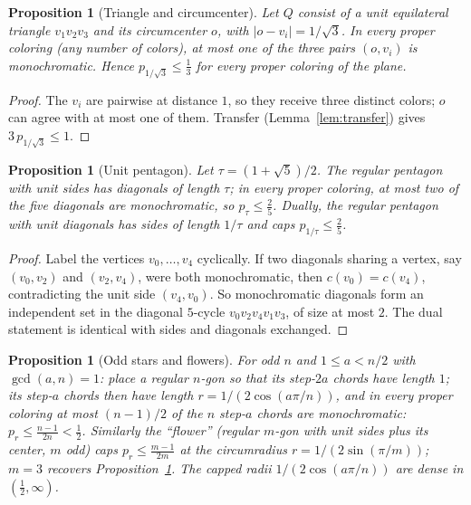 \documentclass[11pt]{article}
\newtheorem{proposition}[theorem]{Proposition}
\theoremstyle{definition}
\theoremstyle{remark}
\begin{document}
\begin{proposition}[Triangle and circumcenter]\label{prop:cap13}
Let $Q$ consist of a unit equilateral triangle $v_1v_2v_3$ and its
circumcenter $o$, with $|o-v_i|=1/\sqrt3$.  In every proper coloring
(any number of colors), at most one of the three pairs $(o,v_i)$ is
monochromatic.  Hence $p_{1/\sqrt3}\le\tfrac13$ for every proper
coloring of the plane.
\end{proposition}

\begin{proof}
The $v_i$ are pairwise at distance $1$, so they receive three distinct
colors; $o$ can agree with at most one of them.  Transfer
(Lemma~\ref{lem:transfer}) gives $3\,p_{1/\sqrt3}\le1$.
\end{proof}

\begin{proposition}[Unit pentagon]\label{prop:cap25}
Let $\tau=(1+\sqrt5)/2$.  The regular pentagon with unit sides has
diagonals of length $\tau$; in every proper coloring, at most two of
the five diagonals are monochromatic, so $p_{\tau}\le\tfrac25$.
Dually, the regular pentagon with unit diagonals has sides of length
$1/\tau$ and caps $p_{1/\tau}\le\tfrac25$.
\end{proposition}

\begin{proof}
Label the vertices $v_0,\dots,v_4$ cyclically.  If two diagonals
sharing a vertex, say $(v_0,v_2)$ and $(v_2,v_4)$, were both
monochromatic, then $c(v_0)=c(v_4)$, contradicting the unit side
$(v_4,v_0)$.  So monochromatic diagonals form an independent set in the
diagonal $5$-cycle $v_0v_2v_4v_1v_3$, of size at most $2$.  The dual
statement is identical with sides and diagonals exchanged.
\end{proof}

\begin{proposition}[Odd stars and flowers]\label{prop:capstar}
For odd $n$ and $1\le a<n/2$ with $\gcd(a,n)=1$: place a regular
$n$-gon so that its step-$2a$ chords have length $1$; its step-$a$
chords then have length $r=1/(2\cos(a\pi/n))$, and in every proper
coloring at most $(n-1)/2$ of the $n$ step-$a$ chords are
monochromatic: $p_r\le\tfrac{n-1}{2n}<\tfrac12$.  Similarly the
``flower'' (regular $m$-gon with unit sides plus its center, $m$ odd)
caps $p_r\le\tfrac{m-1}{2m}$ at the circumradius $r=1/(2\sin(\pi/m))$;
$m=3$ recovers Proposition~\ref{prop:cap13}.  The capped radii
$1/(2\cos(a\pi/n))$ are dense in $(\tfrac12,\infty)$.
\end{proposition}
\end{document}
